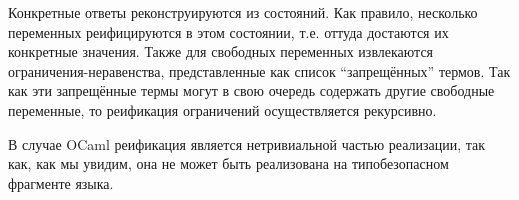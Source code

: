 
Конкретные ответы реконструируются из состояний. Как правило, несколько переменных реифицируются в этом состоянии, т.е. оттуда достаются их конкретные значения.
Также для свободных переменных извлекаются ограничения-неравенства, представленные как список \enquote{запрещённых} термов.
Так как эти запрещённые термы могут в свою очередь содержать другие свободные переменные, то реификация ограничений осуществляется рекурсивно.


В случае OCaml реификация является нетривиальной частью реализации, так как, как мы увидим, она не может быть реализована на типобезопасном фрагменте языка.
